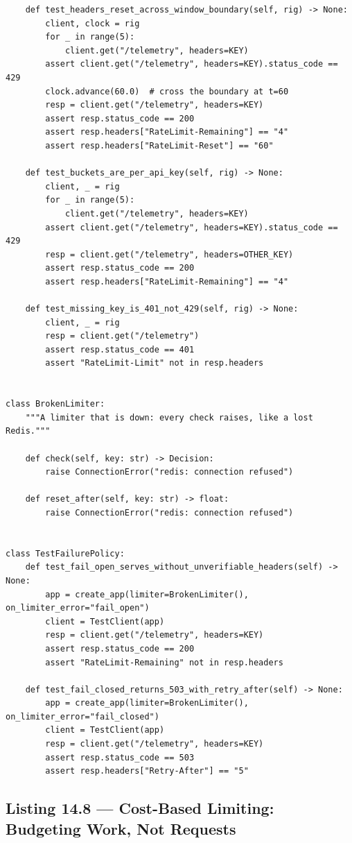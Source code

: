 \begin{verbatim}
    def test_headers_reset_across_window_boundary(self, rig) -> None:
        client, clock = rig
        for _ in range(5):
            client.get("/telemetry", headers=KEY)
        assert client.get("/telemetry", headers=KEY).status_code == 429
        clock.advance(60.0)  # cross the boundary at t=60
        resp = client.get("/telemetry", headers=KEY)
        assert resp.status_code == 200
        assert resp.headers["RateLimit-Remaining"] == "4"
        assert resp.headers["RateLimit-Reset"] == "60"

    def test_buckets_are_per_api_key(self, rig) -> None:
        client, _ = rig
        for _ in range(5):
            client.get("/telemetry", headers=KEY)
        assert client.get("/telemetry", headers=KEY).status_code == 429
        resp = client.get("/telemetry", headers=OTHER_KEY)
        assert resp.status_code == 200
        assert resp.headers["RateLimit-Remaining"] == "4"

    def test_missing_key_is_401_not_429(self, rig) -> None:
        client, _ = rig
        resp = client.get("/telemetry")
        assert resp.status_code == 401
        assert "RateLimit-Limit" not in resp.headers


class BrokenLimiter:
    """A limiter that is down: every check raises, like a lost Redis."""

    def check(self, key: str) -> Decision:
        raise ConnectionError("redis: connection refused")

    def reset_after(self, key: str) -> float:
        raise ConnectionError("redis: connection refused")


class TestFailurePolicy:
    def test_fail_open_serves_without_unverifiable_headers(self) -> None:
        app = create_app(limiter=BrokenLimiter(), on_limiter_error="fail_open")
        client = TestClient(app)
        resp = client.get("/telemetry", headers=KEY)
        assert resp.status_code == 200
        assert "RateLimit-Remaining" not in resp.headers

    def test_fail_closed_returns_503_with_retry_after(self) -> None:
        app = create_app(limiter=BrokenLimiter(), on_limiter_error="fail_closed")
        client = TestClient(app)
        resp = client.get("/telemetry", headers=KEY)
        assert resp.status_code == 503
        assert resp.headers["Retry-After"] == "5"
\end{verbatim}

\subsection{Listing 14.8 --- Cost-Based Limiting: Budgeting Work, Not Requests}
\label{subsec:ch14-listing-cost}


